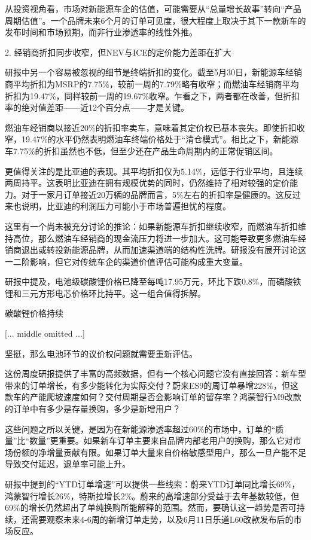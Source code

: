 \documentclass[11pt]{ctexart}
\begin{document}
从投资视角看，市场对新能源车企的估值，可能需要从“总量增长故事”转向“产品周期估值”。一个品牌未来6个月的订单可见度，很大程度上取决于其下一款新车的发布时间和市场预期，而非行业渗透率的线性外推。

2. 经销商折扣同步收窄，但NEV与ICE的定价能力差距在扩大

研报中另一个容易被忽视的细节是终端折扣的变化。截至5月30日，新能源车经销商平均折扣为MSRP的7.75\%，较前一周的7.79\%略有收窄；而燃油车经销商平均折扣为19.47\%，同样较前一周的19.67\%收窄。乍看之下，两者都在改善，但折扣率的绝对值差距——近12个百分点——才是关键。

燃油车经销商以接近20\%的折扣率卖车，意味着其定价权已基本丧失。即使折扣收窄，19.47\%的水平仍然表明燃油车终端价格处于“清仓模式”。相比之下，新能源车7.75\%的折扣虽然也不低，但至少还在产品生命周期内的正常促销区间。

更值得关注的是比亚迪的表现。其平均折扣仅为5.14\%，远低于行业平均，且连续两周持平。这表明比亚迪在拥有规模优势的同时，仍然维持了相对较强的定价能力。对于一家月订单接近20万辆的品牌而言，5\%左右的折扣率是健康的。这反过来也说明，比亚迪的利润压力可能小于市场普遍担忧的程度。

这里有一个尚未被充分讨论的推论：如果新能源车折扣继续收窄，而燃油车折扣维持高位，那么燃油车经销商的现金流压力将进一步加大。这可能导致更多燃油车经销商退出或转投新能源品牌，从而加速渠道端的结构性洗牌。研报没有展开讨论这一二阶影响，但它对传统车企的渠道价值评估可能构成重大变量。

研报中提及，电池级碳酸锂价格已降至每吨17.95万元，环比下跌0.8\%，而磷酸铁锂和三元方形电芯价格环比持平。这一组合值得拆解。

碳酸锂价格持续

[... middle omitted ...]

坚挺，那么电池环节的议价权问题就需要重新评估。

这份周度研报提供了丰富的高频数据，但有一个核心问题它没有直接回答：新车型带来的订单增长，有多少能转化为实际交付？蔚来ES9的周订单暴增228\%，但这款车的产能爬坡速度如何？交付周期是否会影响订单的留存率？鸿蒙智行M9改款的订单中有多少是存量换购，多少是新增用户？

这些问题之所以关键，是因为在新能源渗透率超过60\%的市场中，订单的“质量”比“数量”更重要。如果新车订单主要来自品牌内部老用户的换购，那么它对市场份额的净增量贡献有限。如果订单大量来自价格敏感型用户，那么一旦产能不足导致交付延迟，退单率可能上升。

研报中提到的“YTD订单增速”可以提供一些线索：蔚来YTD订单同比增长69\%，鸿蒙智行增长26\%，特斯拉增长2\%。蔚来的高增速部分受益于去年基数较低，但69\%的增长仍然超出了单纯换购所能解释的范围。然而，要确认这一趋势是否可持续，还需要观察未来4-6周的新增订单走势，以及6月11日乐道L60改款发布后的市场反应。
\end{document}
